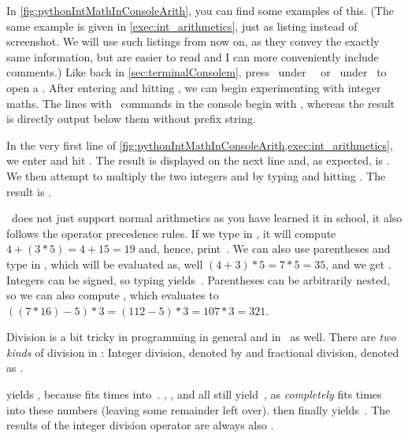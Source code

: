 In \cref{fig:pythonIntMathInConsoleArith}, you can find some examples of this.
(The same example is given in \cref{exec:int_arithmetics}, just as listing instead of screenshot.
We will use such listings from now on, as they convey the exactly same information, but are easier to read and I can more conveniently include comments.)
Like back in \cref{sec:terminalConsolem}, press \ubuntuTerminal\ under \ubuntu\ \linux\ or \windowsTerminal\ under \microsoftWindows\ to open a .
After entering  and hitting \keys{\enter}, we can begin experimenting with integer maths.
The lines with \python\ commands in the console begin with \pythonil{>>>}, whereas the result is directly output below them without prefix string.

In the very first line of \cref{fig:pythonIntMathInConsoleArith,exec:int_arithmetics}, we enter \pythonIdx{+} and hit \keys{\enter}.
The result is displayed on the next line and, as expected, is .
We then attempt to multiply the two integers  and  by typing  and hitting \keys{\enter}.
The result is .

\python\ does not just support normal arithmetics as you have learned it in school, it also follows the operator precedence rules.
If we type in , it will compute $4+(3*5)=4+15=19$\pythonIdx{(}\pythonIdx{)} and, hence, print~.
We can also use parentheses and type in , which will be evaluated as, well $(4+3)*5=7*5=35$, and we get .
Integers can be signed, so typing \pythonIdx{-} yields~.
Parentheses can be arbitrarily nested, so we can also compute , which evaluates to $((7 * 16) - 5) * 3 = (112-5)*3=107*3=321$\pythonIdx{(}\pythonIdx{)}.

Division is a bit tricky in programming in general and in \python\ as well.
There are \emph{two kinds} of division in \python: Integer division, denoted by \pythonilIdx{//} and fractional division, denoted as \pythonilIdx{/}.

 yields , because  fits  times into~.
, , and  all still yield~, as  \emph{completely} fits  times into these numbers (leaving some remainder left over).
 then finally yields~.
The results of the integer division operator \pythonilIdx{//} are always also .

